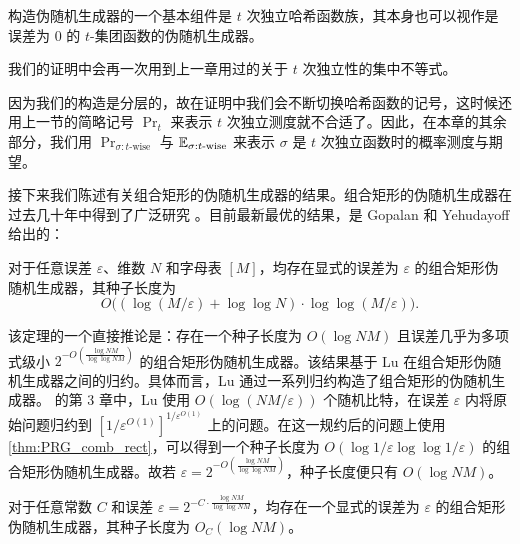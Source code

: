 \PseudoRandomGenerator*

构造伪随机生成器的一个基本组件是 $t$ 次独立哈希函数族，其本身也可以视作是误差为 $0$ 的 $t$-集团函数的伪随机生成器。

\BoundedIndependence*

我们的证明中会再一次用到上一章用过的关于 $t$ 次独立性的集中不等式。

\TWiseTailBound*

因为我们的构造是分层的，故在证明中我们会不断切换哈希函数的记号，这时候还用上一节的简略记号 $\Pr_t$ 来表示 $t$ 次独立测度就不合适了。因此，在本章的其余部分，我们用 $\Pr_{\sigma : t\text{-wise}}$ 与 $\operatorname*{\mathbb{E}}_{\sigma : t\text{-wise}}$ 来表示 $\sigma$ 是 $t$ 次独立函数时的概率测度与期望。

接下来我们陈述有关组合矩形的伪随机生成器的结果。组合矩形的伪随机生成器在过去几十年中得到了广泛研究 \cite{ASWZ96_PRG_rect_comb, LLSZ95,SSZZ00_connection_CR_min_wise, Lu02_domain_reduction, GMRTV, GY20_PRG_CR_SOTA}。目前最新最优的结果，是 Gopalan 和 Yehudayoff \cite{GY20_PRG_CR_SOTA} 给出的：

\begin{theorem}\label{thm:PRG_comb_rect}
    对于任意误差 $\varepsilon$、维数 $N$ 和字母表 $[M]$，均存在显式的误差为 $\varepsilon$ 的组合矩形伪随机生成器，其种子长度为
    $$
    O\big(\left( \log (M / \varepsilon) + \log \log N \right) \cdot \log \log (M/\varepsilon)\big).
    $$
\end{theorem}

该定理的一个直接推论是：存在一个种子长度为 $O(\log NM)$ 且误差几乎为多项式级小 $2^{-O\left(\frac{\log NM}{\log \log NM}\right)}$ 的组合矩形伪随机生成器。该结果基于 Lu \cite{Lu02_domain_reduction} 在组合矩形伪随机生成器之间的归约。具体而言，Lu 通过一系列归约构造了组合矩形的伪随机生成器。\cite{Lu02_domain_reduction} 的第 3 章中，Lu 使用 $O(\log (N M / \varepsilon))$ 个随机比特，在误差 $\varepsilon$ 内将原始问题归约到 $[1/\varepsilon^{O(1)}]^{1/\varepsilon^{O(1)}}$ 上的问题。在这一规约后的问题上使用 \cref{thm:PRG_comb_rect}，可以得到一个种子长度为 $O(\log  1/\varepsilon \log \log 1/\varepsilon)$ 的组合矩形伪随机生成器。故若 $\varepsilon = 2^{-O\left(\frac{\log NM}{\log \log NM}\right)}$，种子长度便只有 $O(\log NM)$。

\begin{corollary}\label{cor:almost_poly_small_error}
    对于任意常数 $C$ 和误差 $\varepsilon = 2^{-C \cdot \frac{\log NM}{\log \log NM}}$，均存在一个显式的误差为 $\varepsilon$ 的组合矩形伪随机生成器，其种子长度为 $O_C(\log NM)$。
\end{corollary}

